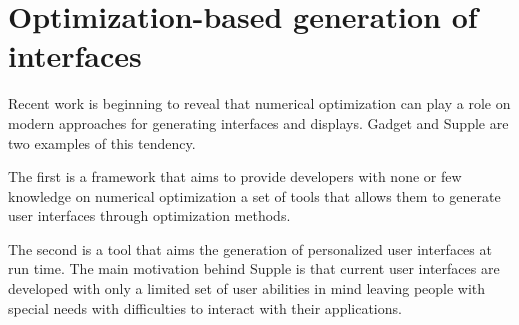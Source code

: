 \section{Optimization-based generation of interfaces}
\label{section:optimization_based_generation_of_interfaces}

Recent work is beginning to reveal that numerical optimization can play a role on modern approaches for generating interfaces and displays. Gadget\cite{gadget} and Supple\cite{supple} are two examples of this tendency.

The first is a framework that aims to provide developers with none or few knowledge on numerical optimization a set of tools that allows them to generate user interfaces through optimization methods.

The second is a tool that aims the generation of personalized user interfaces at run time. The main motivation behind Supple is that current user interfaces are developed with only a limited set of user abilities in mind leaving people with special needs with difficulties to interact with their applications.


